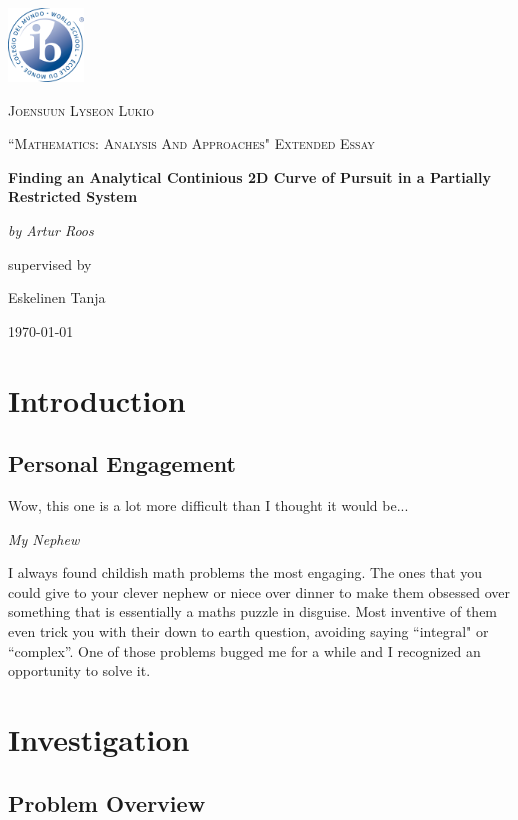 \documentclass[12pt]{article}
\begin{document}
\begin{titlepage}
	\centering
	\includegraphics[width=0.15\textwidth]{dp-programme-logo}\par\vspace{1cm}
	{\textsc{Joensuun Lyseon Lukio} \par}
	\vspace{1cm}
	{\Large \textsc{``Mathematics: Analysis And Approaches" Extended Essay}\par}
	\vspace{1.5cm}
	{\huge\bfseries Finding an Analytical Continious 2D Curve of Pursuit in a Partially Restricted System\par}
	\vspace{2cm}
	{\Large\itshape by Artur Roos\par}
	\vfill
	supervised by\par
	Eskelinen Tanja
	\vfill
	{\large \today\par}
\end{titlepage}

\clearpage
{}
\tableofcontents
\vspace{48pt}

\section{Introduction}
\subsection{Personal Engagement}
\epigraph{Wow, this one is a lot more difficult than I thought it would be...}{\textit{My Nephew}}
I always found childish math problems the most engaging. The ones that you could give to your clever nephew or niece over dinner to make them obsessed over something that is essentially a maths puzzle in disguise. Most inventive of them even trick you with their down to earth question, avoiding saying ``integral" or ``complex''. One of those problems bugged me for a while and I recognized an opportunity to solve it.

\section{Investigation}
\subsection{Problem Overview}
\end{document}
